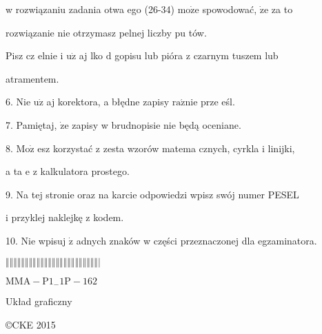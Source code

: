 \documentclass[a4paper,12pt]{article}
\begin{document}
w rozwiązaniu zadania otwa ego (26-34) $\mathrm{m}\mathrm{o}\dot{\mathrm{z}}\mathrm{e}$ spowodować, $\dot{\mathrm{z}}\mathrm{e}$ za to

rozwiązanie nie otrzymasz pelnej liczby pu tów.

Pisz cz elnie i $\mathrm{u}\dot{\mathrm{z}}$ aj lko $\mathrm{d}$ gopisu lub pióra z czarnym tuszem lub

atramentem.

6. Nie $\mathrm{u}\dot{\mathrm{z}}$ aj korektora, a błędne zapisy $\mathrm{r}\mathrm{a}\acute{\mathrm{z}}\mathrm{n}\mathrm{i}\mathrm{e}$ prze eśl.

7. Pamiętaj, $\dot{\mathrm{z}}\mathrm{e}$ zapisy w brudnopisie nie będą oceniane.

8. $\mathrm{M}\mathrm{o}\dot{\mathrm{z}}$ esz korzystać z zesta wzorów matema cznych, cyrkla i linijki,

a ta $\mathrm{e}$ z kalkulatora prostego.

9. Na tej stronie oraz na karcie odpowiedzi wpisz swój numer PESEL

i przyklej naklejkę z kodem.

10. Nie wpisuj $\dot{\mathrm{z}}$ adnych znaków w części przeznaczonej dla egzaminatora.

$\Vert\Vert\Vert\Vert\Vert\Vert\Vert\Vert\Vert\Vert\Vert\Vert\Vert\Vert\Vert\Vert\Vert\Vert\Vert\Vert\Vert\Vert\Vert\Vert|$

$\mathrm{M}\mathrm{M}\mathrm{A}-\mathrm{P}1_{-}1\mathrm{P}-162$

Układ graficzny

\copyright CKE 2015
\end{document}
